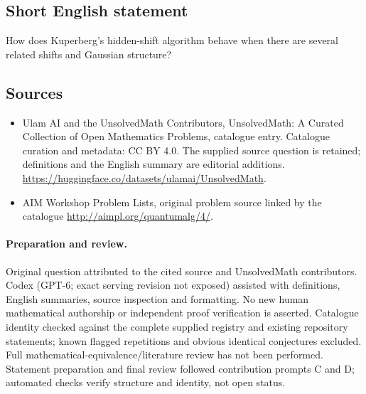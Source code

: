 \documentclass[11pt]{article}
\begin{document}
\subsection{Short English statement}
How does Kuperberg's hidden-shift algorithm behave when there are several related shifts and Gaussian structure?
\subsection{Sources}
\begin{itemize}
\item[\hypertarget{source:statement:1}{S1}] Ulam AI and the UnsolvedMath Contributors, UnsolvedMath: A Curated Collection of Open Mathematics Problems, catalogue entry. Catalogue curation and metadata: CC BY 4.0. The supplied source question is retained; definitions and the English summary are editorial additions.
\url{https://huggingface.co/datasets/ulamai/UnsolvedMath}.
\item[\hypertarget{source:statement:2}{S2}] AIM Workshop Problem Lists, original problem source linked by the catalogue
\url{http://aimpl.org/quantumalg/4/}.
\end{itemize}
\paragraph{Preparation and review.}
Original question attributed to the cited source and UnsolvedMath contributors. Codex (GPT-6; exact serving revision not exposed) assisted with definitions, English summaries, source inspection and formatting. No new human mathematical authorship or independent proof verification is asserted. Catalogue identity checked against the complete supplied registry and existing repository statements; known flagged repetitions and obvious identical conjectures excluded. Full mathematical-equivalence/literature review has not been performed. Statement preparation and final review followed contribution prompts C and D; automated checks verify structure and identity, not open status.
\label{end:statement}
\end{document}
